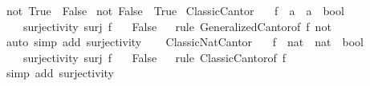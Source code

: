 \begin{isabellebody}
{\isachardoublequoteopen}not\ True\ {\isacharequal}{\kern0pt}\ False{\isachardoublequoteclose}\ {\isacharbar}{\kern0pt}\isanewline
{\isachardoublequoteopen}not\ False\ {\isacharequal}{\kern0pt}\ True{\isachardoublequoteclose}\isanewline
\isanewline
{}\isamarkupfalse%
\ {\isachardoublequoteopen}Classic{\isacharunderscore}{\kern0pt}Cantor{\isachardoublequoteclose}{\isacharcolon}{\kern0pt}\isanewline
\ \ \ f\ {\isacharcolon}{\kern0pt}{\isacharcolon}{\kern0pt}\ {\isachardoublequoteopen}{\isacharprime}{\kern0pt}a\ {\isasymRightarrow}\ {\isacharprime}{\kern0pt}a\ {\isasymRightarrow}\ bool{\isachardoublequoteclose}\isanewline
\ \ \ surjectivity{\isacharcolon}{\kern0pt}\ {\isachardoublequoteopen}surj\ f{\isachardoublequoteclose}\isanewline
\ \ \ {\isachardoublequoteopen}False{\isachardoublequoteclose}\isanewline
%
\isadelimproof
\ \ %
\endisadelimproof
%
\isatagproof
{}\isamarkupfalse%
{\isacharparenleft}{\kern0pt}rule\ Generalized{\isacharunderscore}{\kern0pt}Cantor{\isacharbrackleft}{\kern0pt}of\ f\ not{\isacharbrackright}{\kern0pt}{\isacharparenright}{\kern0pt}\isanewline
\ \ \isamarkupfalse%
{\isacharparenleft}{\kern0pt}auto\ simp\ add{\isacharcolon}{\kern0pt}\ surjectivity{\isacharparenright}{\kern0pt}\isanewline
\ \ \isamarkupfalse%
%
\endisatagproof
{\isafoldproof}%
%
\isadelimproof
\isanewline
%
\endisadelimproof
\isanewline
\isanewline
\isanewline
{}\isamarkupfalse%
\ {\isachardoublequoteopen}Classic{\isacharunderscore}{\kern0pt}Nat{\isacharunderscore}{\kern0pt}Cantor{\isachardoublequoteclose}{\isacharcolon}{\kern0pt}\isanewline
\ \ \ f\ {\isacharcolon}{\kern0pt}{\isacharcolon}{\kern0pt}\ {\isachardoublequoteopen}nat\ {\isasymRightarrow}\ nat\ {\isasymRightarrow}\ bool{\isachardoublequoteclose}\isanewline
\ \ \ surjectivity{\isacharcolon}{\kern0pt}\ {\isachardoublequoteopen}surj\ f{\isachardoublequoteclose}\isanewline
\ \ \ {\isachardoublequoteopen}False{\isachardoublequoteclose}\isanewline
%
\isadelimproof
\ \ %
\endisadelimproof
%
\isatagproof
{}\isamarkupfalse%
{\isacharparenleft}{\kern0pt}rule\ Classic{\isacharunderscore}{\kern0pt}Cantor{\isacharbrackleft}{\kern0pt}of\ f{\isacharbrackright}{\kern0pt}{\isacharparenright}{\kern0pt}\isanewline
\ \ \isamarkupfalse%
{\isacharparenleft}{\kern0pt}simp\ add{\isacharcolon}{\kern0pt}\ surjectivity{\isacharparenright}{\kern0pt}\isanewline
\ \ \isamarkupfalse%
%
\endisatagproof
{\isafoldproof}%
%
\isadelimproof
\isanewline
%
\endisadelimproof
%
\isadelimtheory
\isanewline
%
\endisadelimtheory
%
\isatagtheory
{}\isamarkupfalse%
%
\endisatagtheory
{\isafoldtheory}%
%
\isadelimtheory
%
\endisadelimtheory
%
\end{isabellebody}%
